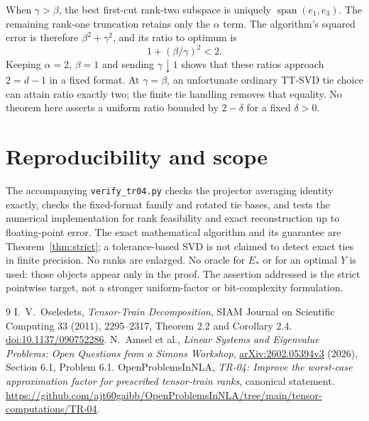 \documentclass[11pt]{article}
\begin{document}
When $\gamma>\beta$, the best first-cut rank-two subspace is uniquely
$\operatorname{span}(e_1,e_3)$. The remaining rank-one truncation retains
only the $\alpha$ term. The algorithm's squared error is therefore
$\beta^2+\gamma^2$, and its ratio to optimum is
\[
 1+(\beta/\gamma)^2<2.
\]
Keeping $\alpha=2$, $\beta=1$ and sending $\gamma\downarrow1$ shows that
these ratios approach $2=d-1$ in a fixed format. At $\gamma=\beta$,
an unfortunate ordinary TT-SVD tie choice can attain ratio exactly two;
the finite tie handling removes that equality. No theorem here asserts
a uniform ratio bounded by $2-\delta$ for a fixed $\delta>0$.

\section{Reproducibility and scope}
The accompanying \texttt{verify\_tr04.py} checks the projector averaging
identity exactly, checks the fixed-format family and rotated tie bases,
and tests the numerical implementation for rank feasibility and exact
reconstruction up to floating-point error. The exact mathematical
algorithm and its guarantee are Theorem~\ref{thm:strict}; a tolerance-based
SVD is not claimed to detect exact ties in finite precision.
No ranks are enlarged. No oracle for $E_*$ or for an optimal $Y$ is used:
those objects appear only in the proof. The assertion addressed is the
strict pointwise target, not a stronger uniform-factor or bit-complexity
formulation.

\begin{thebibliography}{9}
I.~V.~Oseledets, \emph{Tensor-Train Decomposition},
SIAM Journal on Scientific Computing 33 (2011), 2295--2317,
Theorem 2.2 and Corollary 2.4.
\href{https://doi.org/10.1137/090752286}{doi:10.1137/090752286}.
N.~Amsel et al., \emph{Linear Systems and Eigenvalue Problems:
Open Questions from a Simons Workshop},
\href{https://arxiv.org/abs/2602.05394}{arXiv:2602.05394v3} (2026),
Section 6.1, Problem 6.1.
OpenProblemsInNLA, \emph{TR-04: Improve the worst-case approximation
factor for prescribed tensor-train ranks}, canonical statement.
\url{https://github.com/ajt60gaibb/OpenProblemsInNLA/tree/main/tensor-computations/TR-04}.
\end{thebibliography}
\end{document}

